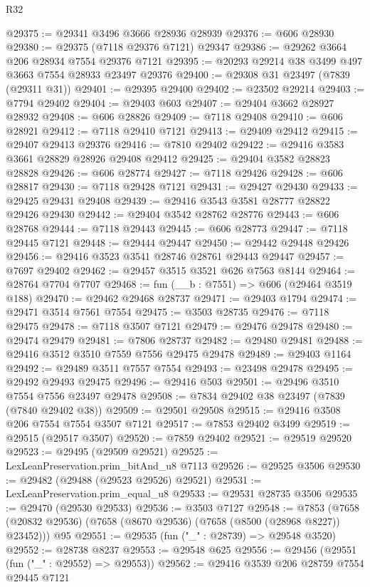 \begin{lexlean}{R32}
\begin{coremodule}
@29375 := @29341 @3496 @3666 @28936 @28939
@29376 := @606 @28930
@29380 := @29375 (@7118 @29376 @7121) @29347
@29386 := @29262 @3664 @206 @28934 @7554 @29376 @7121
@29395 := @20293 @29214 @38 @3499 @497 @3663 @7554 @28933 @23497 @29376
@29400 := @29308 @31 @23497 (@7839 (@29311 @31))
@29401 := @29395 @29400
@29402 := @23502 @29214
@29403 := @7794 @29402
@29404 := @29403 @603
@29407 := @29404 @3662 @28927 @28932
@29408 := @606 @28826
@29409 := @7118 @29408
@29410 := @606 @28921
@29412 := @7118 @29410 @7121
@29413 := @29409 @29412
@29415 := @29407 @29413 @29376
@29416 := @7810 @29402
@29422 := @29416 @3583 @3661 @28829 @28926 @29408 @29412
@29425 := @29404 @3582 @28823 @28828
@29426 := @606 @28774
@29427 := @7118 @29426
@29428 := @606 @28817
@29430 := @7118 @29428 @7121
@29431 := @29427 @29430
@29433 := @29425 @29431 @29408
@29439 := @29416 @3543 @3581 @28777 @28822 @29426 @29430
@29442 := @29404 @3542 @28762 @28776
@29443 := @606 @28768
@29444 := @7118 @29443
@29445 := @606 @28773
@29447 := @7118 @29445 @7121
@29448 := @29444 @29447
@29450 := @29442 @29448 @29426
@29456 := @29416 @3523 @3541 @28746 @28761 @29443 @29447
@29457 := @7697 @29402
@29462 := @29457 @3515 @3521 @626 @7563 @8144
@29464 := @28764 @7704 @7707
@29468 := fun (__b : @7551) => @606 (@29464 @3519 @188)
@29470 := @29462 @29468 @28737
@29471 := @29403 @1794
@29474 := @29471 @3514 @7561 @7554
@29475 := @3503 @28735
@29476 := @7118 @29475
@29478 := @7118 @3507 @7121
@29479 := @29476 @29478
@29480 := @29474 @29479
@29481 := @7806 @28737
@29482 := @29480 @29481
@29488 := @29416 @3512 @3510 @7559 @7556 @29475 @29478
@29489 := @29403 @1164
@29492 := @29489 @3511 @7557 @7554
@29493 := @23498 @29478
@29495 := @29492 @29493 @29475
@29496 := @29416 @503
@29501 := @29496 @3510 @7554 @7556 @23497 @29478
@29508 := @7834 @29402 @38 @23497 (@7839 (@7840 @29402 @38))
@29509 := @29501 @29508
@29515 := @29416 @3508 @206 @7554 @7554 @3507 @7121
@29517 := @7853 @29402 @3499
@29519 := @29515 (@29517 @3507)
@29520 := @7859 @29402
@29521 := @29519 @29520
@29523 := @29495 (@29509 @29521)
@29525 := LexLeanPreservation.prim_bitAnd_u8 @7113
@29526 := @29525 @3506
@29530 := @29482 (@29488 (@29523 @29526) @29521)
@29531 := LexLeanPreservation.prim_equal_u8
@29533 := @29531 @28735 @3506
@29535 := @29470 (@29530 @29533)
@29536 := @3503 @7127
@29548 := @7853
    (@7658 (@20832 @29536) (@7658 (@8670 @29536) (@7658 (@8500 (@28968 @8227)) @23452)))
    @95
@29551 := @29535 (fun ("_" : @28739) => @29548 @3520)
@29552 := @28738 @8237
@29553 := @29548 @625
@29556 := @29456 (@29551 (fun ("_" : @29552) => @29553))
@29562 := @29416 @3539 @206 @28759 @7554 @29445 @7121

\end{coremodule}
\end{lexlean}
